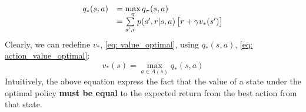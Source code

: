 \documentclass[10pt]{article}
\makeatletter
\renewcommand{\section}{\@startsection{section}{1}{0mm}%
                                {-1ex plus -.5ex minus -.2ex}%
                                {0.5ex plus .2ex}%
                                {\normalfont\large\bfseries}}
\renewcommand{\subsection}{\@startsection{subsection}{2}{0mm}%
                                {-1explus -.5ex minus -.2ex}%
                                {0.1ex plus .0ex}%
                                {\normalfont\normalsize\bfseries}}
\makeatother
\begin{document}
\begin{multicols*}{2}
\begin{equation}
\begin{array}{l l}
q_*(s,a) &= \max\limits_{\pi} q_\pi(s,a) \\
&= \sum\limits_{s',r} p(s', r| s, a)\begin{bmatrix}r +\gamma  v_{*}(s') \end{bmatrix}
\end{array}
\label{eq: action_value_optimal}
\end{equation}
Clearly, we can redefine $v_*$, \eqref{eq: value_optimal}, using $q_*(s,a)$, \eqref{eq: action_value_optimal}:
\begin{equation*}
v_*(s) = \max\limits_{a \in A(s)} q_{*}(s,a)
\end{equation*}
Intuitively, the above equation express the fact that the value of a state under the optimal policy \textbf{must be equal} to the expected return from the best action from that state.

%
%
%
%
%
%


\end{multicols*}
\end{document}
